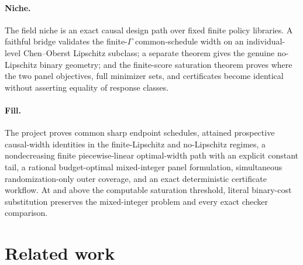 \documentclass{article}
\begin{document}
\paragraph{Niche.} The field niche is an exact causal design path over fixed finite policy libraries. A faithful bridge validates the finite-\(\Gamma\) common-schedule width on an individual-level Chen--Oberst Lipschitz subclass; a separate theorem gives the genuine no-Lipschitz binary geometry; and the finite-score saturation theorem proves where the two panel objectives, full minimizer sets, and certificates become identical without asserting equality of response classes.

\paragraph{Fill.} The project proves common sharp endpoint schedules, attained prospective causal-width identities in the finite-Lipschitz and no-Lipschitz regimes, a nondecreasing finite piecewise-linear optimal-width path with an explicit constant tail, a rational budget-optimal mixed-integer panel formulation, simultaneous randomization-only outer coverage, and an exact deterministic certificate workflow. At and above the computable saturation threshold, literal binary-cost substitution preserves the mixed-integer problem and every exact checker comparison.

\section{Related work}
\end{document}
